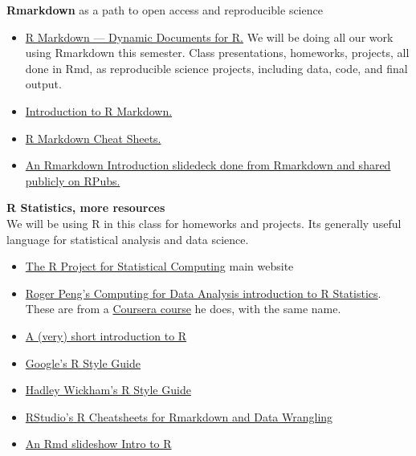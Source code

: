 \documentclass[11pt]{article} %
\begin{document}
    {\bf Rmarkdown} as a path to open access and reproducible science
    
      \begin{itemize}
        \item \href{"http://rmarkdown.rstudio.com/"}{ R Markdown — Dynamic Documents for R.} We will be doing all our work using Rmarkdown this semester. 
        Class presentations, homeworks, projects, all done in Rmd, as reproducible science projects, including data, code, and final output. 
        \item \href{"http://shiny.rstudio.com/articles/rmarkdown.html"}{ Introduction to R Markdown.}
        \item \href{"http://www.rstudio.com/resources/cheatsheets/"}{ R Markdown Cheat Sheets.}
        \item \href{"http://rpubs.com/mansun_kuo/24330"}{ An Rmarkdown Introduction slidedeck done from Rmarkdown and shared publicly on RPubs.}
      \end{itemize}
    
    {\bf R Statistics, more resources} \\
              We will be using R in this class for homeworks and projects. Its generally useful language for statistical analysis and data science. 
      \begin{itemize}
        \item \href{"http://www.r-project.org/index.html"}{The R Project for Statistical Computing}  \cite{r_r_2014} main website
        \item \href{"https://www.youtube.com/user/rdpeng/playlists"}{Roger Peng's Computing for Data Analysis introduction to R Statistics}. 
        These are from a \href{"https://www.coursera.org/course/compdata"} {Coursera course} he does, with the same name. \cite{peng_computing_2014}\item \href{"http://cran.r-project.org/doc/contrib/Torfs+Brauer-Short-R-Intro.pdf"}{A (very) short introduction to R}  \cite{torfs_very_2014}
        \item \href{"https://google-styleguide.googlecode.com/svn/trunk/Rguide.xml"}{ Google's R Style Guide}
        \item \href{"http://stat405.had.co.nz/r-style.html"}{ Hadley Wickham's R Style Guide}  
        \item \href{"http://www.rstudio.com/resources/cheatsheets/"}{ RStudio's R Cheatsheets for Rmarkdown and Data Wrangling}
        \item \href{"http://www.theresearchkitchen.com/blog"}{An Rmd slideshow Intro to R}
      \end{itemize}
    
\end{document}
